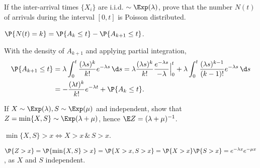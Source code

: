 \begin{exercise}\label{ex:l-213}
 If 
 the inter-arrival times $\{X_i\}$ are i.i.d.
 $\sim \Exp(\lambda)$, prove that the number $N(t)$ of arrivals during the interval $[0,t]$ is Poisson distributed.
\begin{hint}
 $\P{N(t)=k} = \P{A_k \leq t} - \P{A_{k+1} \leq t}$.
\end{hint}
\begin{solution}
With  the density of $A_{k+1}$ and applying partial integration,
\begin{align*}
\P{A_{k+1} \leq t}
&= \lambda \int_0^t \frac{(\lambda s)^{k}}{k!}e^{-\lambda s}\, \d s
= \lambda \frac{(\lambda s)^{k}}{k!}\frac{e^{-\lambda s}}{-\lambda} \Big|_{0}^t + \lambda \int_0^t \frac{(\lambda s)^{k-1}}{(k-1)!}e^{-\lambda s}\, \d s \\
&= - \frac{(\lambda t)^{k}}{k!} e^{-\lambda t} + \P{A_k \leq t}.
\end{align*}
\end{solution}
\end{exercise}



\begin{exercise}\label{ex:10}
 If  $X\sim\Exp(\lambda), S\sim\Exp(\mu)$ and
 independent, show that $Z=\min\{X,S\}\sim\Exp(\lambda+\mu)$,
hence $\E Z = (\lambda+\mu)^{-1}$.
\begin{hint}
$\min\{X, S\}>x \iff X>x \, \& \, S> x$.
\end{hint}
\begin{solution}
$\P{Z>x} = \P{\min\{X,S\}>x} = \P{X>x, S> x} = \P{X>x}\P{S>x}  = e^{-\lambda x} e^{-\mu x}$, as  $X$ and $S$ independent.
\end{solution}
\end{exercise}

